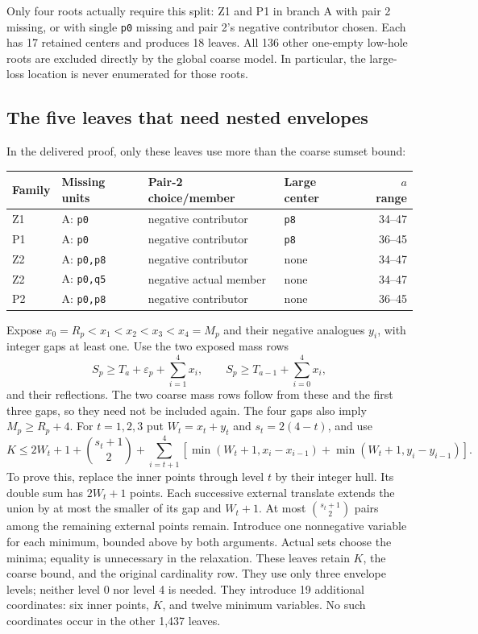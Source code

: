 \documentclass[11pt,a4paper]{article}
\begin{document}
Only four roots actually require this split:
Z1 and P1 in branch A with pair 2 missing, or with single \texttt{p0}
missing and pair 2's negative contributor chosen. Each has 17 retained
centers and produces 18 leaves. All 136 other one-empty low-hole roots
are excluded directly by the global coarse model. In particular, the
large-loss location is never enumerated for those roots.

\subsection{The five leaves that need nested envelopes}
In the delivered proof, only these leaves use more than the coarse sumset bound:
\begin{center}\small
\begin{tabular}{llllr}
\toprule
Family&Missing units&Pair-2 choice/member&Large center&$a$ range\\
\midrule
Z1&A: \texttt{p0}&negative contributor&\texttt{p8}&34--47\\
P1&A: \texttt{p0}&negative contributor&\texttt{p8}&36--45\\
Z2&A: \texttt{p0,p8}&negative contributor&none&34--47\\
Z2&A: \texttt{p0,q5}&negative actual member&none&34--47\\
P2&A: \texttt{p0,p8}&negative contributor&none&36--45\\
\bottomrule
\end{tabular}
\end{center}
Expose $x_0=R_p<x_1<x_2<x_3<x_4=M_p$ and their negative analogues
$y_i$, with integer gaps at least one. Use the two exposed mass rows
\[
 S_p\ge T_a+\varepsilon_p+\sum_{i=1}^4x_i,
 \qquad S_p\ge T_{a-1}+\sum_{i=0}^4x_i,
\]
and their reflections. The two coarse mass rows follow from these
and the first three gaps, so they need not be included again.
The four gaps also imply $M_p\ge R_p+4$.
For $t=1,2,3$ put $W_t=x_t+y_t$ and $s_t=2(4-t)$, and use
\begin{equation}\label{eq:nested}
 K\le2W_t+1+\binom{s_t+1}{2}
 +\sum_{i=t+1}^4\left[
 \min(W_t+1,x_i-x_{i-1})+\min(W_t+1,y_i-y_{i-1})\right].
\end{equation}
To prove this, replace the inner points through level $t$ by their
integer hull. Its double sum has $2W_t+1$ points. Each successive
external translate extends the union by at most the smaller of its
gap and $W_t+1$. At most $\binom{s_t+1}{2}$ pairs among the remaining
external points remain. Introduce one nonnegative variable for each
minimum, bounded above by both arguments. Actual sets choose the minima;
equality is unnecessary in the relaxation.
These leaves retain $K$, the coarse bound, and the original cardinality
row. They use only three envelope levels; neither level 0 nor level 4
is needed. They introduce 19 additional coordinates: six inner points,
$K$, and twelve minimum variables. No such coordinates occur in the
other 1,437 leaves.
\end{document}
